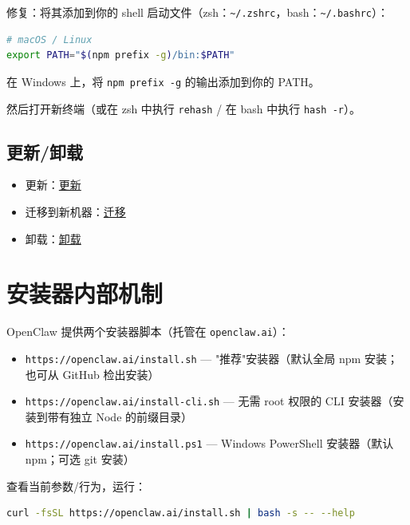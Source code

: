 修复：将其添加到你的 shell 启动文件（zsh：\texttt{\textasciitilde{}/.zshrc}，bash：\texttt{\textasciitilde{}/.bashrc}）：

\begin{lstlisting}[language=bash]
# macOS / Linux
export PATH="$(npm prefix -g)/bin:$PATH"
\end{lstlisting}


在 Windows 上，将 \texttt{npm prefix -g} 的输出添加到你的 PATH。

然后打开新终端（或在 zsh 中执行 \texttt{rehash} / 在 bash 中执行 \texttt{hash -r}）。

\subsection{更新/卸载}


\begin{itemize}
  \item 更新：\href{/install/updating}{更新}
  \item 迁移到新机器：\href{/install/migrating}{迁移}
  \item 卸载：\href{/install/uninstall}{卸载}
\end{itemize}



\clearpage

\section{安装器内部机制}


OpenClaw 提供两个安装器脚本（托管在 \texttt{openclaw.ai}）：

\begin{itemize}
  \item \texttt{https://openclaw.ai/install.sh} — "推荐"安装器（默认全局 npm 安装；也可从 GitHub 检出安装）
  \item \texttt{https://openclaw.ai/install-cli.sh} — 无需 root 权限的 CLI 安装器（安装到带有独立 Node 的前缀目录）
  \item \texttt{https://openclaw.ai/install.ps1} — Windows PowerShell 安装器（默认 npm；可选 git 安装）
\end{itemize}


查看当前参数/行为，运行：

\begin{lstlisting}[language=bash]
curl -fsSL https://openclaw.ai/install.sh | bash -s -- --help
\end{lstlisting}


